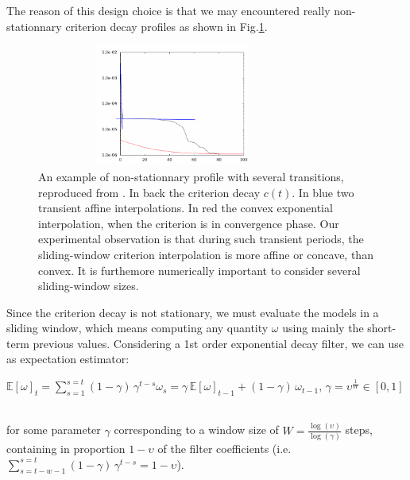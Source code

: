 \documentclass{article}
\newcommand{\eqline}[1]{\\\centerline{$#1$}\\}
\begin{document}
The reason of this design choice is that we may encountered really non-stationnary criterion decay profiles as shown in Fig.\ref{spurious-cost}.

\begin{figure}[!ht]
\centerline{\includegraphics[width=0.8\textwidth,height=4cm]{img/spurious-cost}}
  \caption{An example of non-stationnary profile with several transitions, reproduced from \cite{vieville:hal-01610735}. In back the criterion decay $c(t)$. In blue two transient affine interpolations. In red the convex exponential interpolation, when the criterion is in convergence phase. Our experimental observation is that during such transient periods, the sliding-window criterion interpolation is more affine or concave, than convex. It is furthemore numerically important to consider several sliding-window sizes.}
  \label{spurious-cost}
\end{figure}

Since the criterion decay is not stationary, we must evaluate the models in a sliding window, which means computing any quantity $\omega$ using mainly the short-term previous values. Considering a 1st order exponential decay filter, we can use as expectation estimator:
\eqline{\mathbb{E}[\omega]_{t} = \sum_{s=1}^{s=t} (1 - \gamma) \, \gamma^{t-s} \omega_s = \gamma \, \mathbb{E}[\omega]_{t - 1} + (1 - \gamma) \, \omega_{t-1} , \, \gamma = \upsilon^{\frac{1}{W}} \in [0, 1]}
for some parameter $\gamma$ corresponding to a window size of $W=\frac{\log(\upsilon)}{\log(\gamma)}$ steps, containing in proportion $1 - \upsilon$ of the filter coefficients (i.e. $\sum_{s=t-w-1}^{s=t} (1 - \gamma) \, \gamma^{t-s} = 1 - \upsilon$). 
\end{document}
